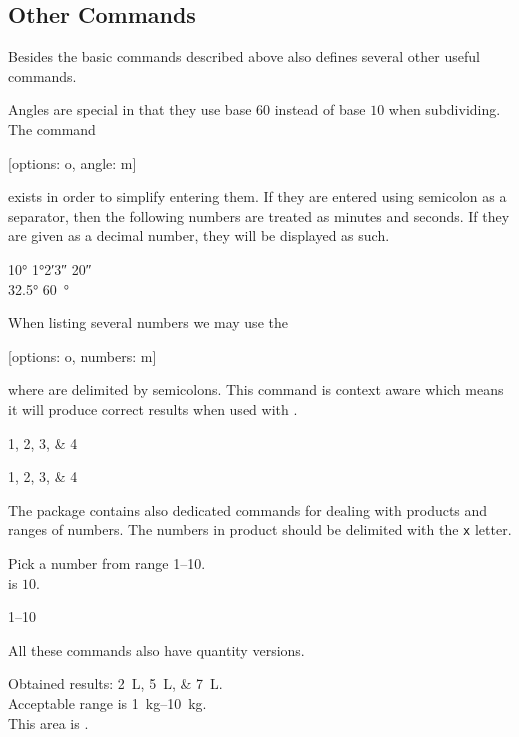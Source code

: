 \subsection{Other  Commands}

Besides the basic commands described above  also defines several
other useful commands.

Angles are special in that they use base \(60\) instead of base \(10\) when
subdividing. The command
\begin{lscommand}
  [options: o, angle: m]
\end{lscommand}
exists in order to simplify entering them. If they are entered using semicolon
as a separator, then the following numbers are treated as minutes and seconds.
If they are given as a decimal number, they will be displayed as such.
\begin{example}
\ang{10}
\qquad %
\ang{1;2;3}
\qquad %
\ang{;;20} \\
\ang{32.5}
\qquad %
\qty{60}{\degree}
\end{example}

When listing several numbers we may use the
\begin{lscommand}
  [options: o, numbers: m]
\end{lscommand}
where  are delimited by semicolons. This command is context aware
which means it will produce correct results when used with .
\begin{example}
\numlist{1;2;3;4}

\begin{german}
  \numlist{1;2;3;4}
\end{german}
\end{example}

The package contains also dedicated commands for dealing with products and
ranges of numbers. The numbers in product should be delimited with the \verb|x|
letter.
\begin{example}
Pick a number from
range \numrange{1}{10}. \\
 is \(10\). \\
\begin{german}
  \numrange{1}{10}
\end{german}
\end{example}

All these commands also have quantity versions.
\begin{example}
Obtained results:
\qtylist{2;5;7}{\L}.\\
Acceptable range is
\qtyrange{1}{10}{\kg}. \\
This area is
.
\end{example}

